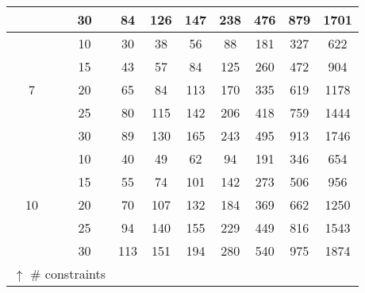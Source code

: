 \begin{table}[]
{\begin{tabular}{|c|c|ccccccc|}
&30                                                           & 84  & 126  & 147 & 238  & 476  & 879  & 1701  \\
\hline
\hline
\multirow{5}{*}{7}&10                                        & 30  & 38  & 56  & 88 & 181 & 327 &  622  \\
&15                                                           & 43 & 57 & 84 & 125 & 260 & 472 & 904   \\
&20                                                           & 65 & 84 & 113 & 170 & 335 & 619 & 1178  \\
&25                                                           & 80  & 115 & 142 & 206 & 418 & 759 & 1444  \\
&30                                                           & 89  & 130 & 165 & 243 & 495 & 913 & 1746  \\
\hline
\hline
\multirow{5}{*}{10}&10                                        & 40 & 49 & 62 & 94 & 191 & 346 & 654   \\
&15                                                           & 55 & 74 & 101 & 142 & 273 & 506 & 956   \\
&20                                                           & 70 & 107 & 132 & 184 & 369 & 662 & 1250  \\
&25                                                           & 94 & 140 & 155 & 229 & 449 & 816 & 1543   \\
&30                                                           & 113 & 151 & 194 & 280 & 540 & 975 & 1874  \\
\hline 
\hline
\multicolumn{2}{|c}{ $\uparrow$ \# constraints}  &  &  &  &  &  &  &   \\
\hline
\end{tabular}
}
\end{table}

